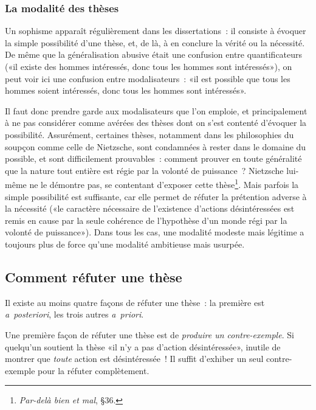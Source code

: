 \documentclass[a4paper,11pt]{article}
\begin{document}
\subsubsection{La modalité des thèses}

Un sophisme apparaît régulièrement dans les dissertations~: il consiste
à évoquer la simple possibilité d'une thèse, et, de là, à en conclure la
vérité ou la nécessité. De même que la généralisation abusive était une
confusion entre quantificateurs («il existe des hommes intéressés, donc
tous les hommes sont intéressés»), on peut voir ici une confusion entre
modalisateurs~: «il est possible que tous les hommes soient intéressés,
donc tous les hommes sont intéressés».

\par

Il faut donc prendre garde aux modalisateurs que l'on emploie, et
principalement à ne pas considérer comme avérées des thèses dont on
s'est contenté d'évoquer la possibilité. Assurément, certaines thèses,
notamment dans les philosophies du soupçon comme celle de Nietzsche,
sont condamnées à rester dans le domaine du possible, et sont
difficilement prouvables~: comment prouver en toute généralité que la
nature tout entière est régie par la volonté de puissance~? Nietzsche
lui-même ne le démontre pas, se contentant d'exposer cette
thèse\footnote{\emph{Par-delà bien et mal}, §36.}. Mais parfois la
simple possibilité est suffisante, car elle permet de réfuter la
prétention adverse à la nécessité («le caractère nécessaire de
l'existence d'actions désintéressées est remis en cause par la seule
cohérence de l'hypothèse d'un monde régi par la volonté de
puissance»). Dans tous les cas, une modalité modeste mais légitime a
toujours plus de force qu'une modalité ambitieuse mais usurpée.


\subsection{Comment réfuter une thèse}

Il existe au moins quatre façons de réfuter une thèse~: la première est
\emph{a~posteriori}, les trois autres \emph{a~priori}.

\par

Une première façon de réfuter une thèse est de \emph{produire un
  contre-exemple}. Si quelqu'un soutient la thèse «il n'y a pas d'action
désintéressée», inutile de montrer que \emph{toute} action est
désintéressée~! Il suffit d'exhiber un seul contre-exemple pour la
réfuter complètement.
\end{document}
